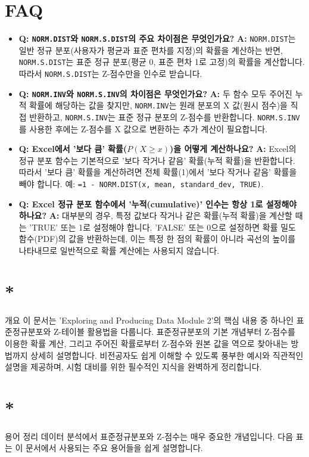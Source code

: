 \documentclass[11pt,a4paper]{article}
\theoremstyle{definition}
\newcommand{\newsection}[1]{\newpage\section{#1}}
\begin{document}
\newsection{FAQ}

\begin{itemize}
    \item \textbf{Q: \texttt{NORM.DIST}와 \texttt{NORM.S.DIST}의 주요 차이점은 무엇인가요?}
    \textbf{A:} \texttt{NORM.DIST}는 일반 정규 분포(사용자가 평균과 표준 편차를 지정)의 확률을 계산하는 반면, \texttt{NORM.S.DIST}는 표준 정규 분포(평균 0, 표준 편차 1로 고정)의 확률을 계산합니다. 따라서 \texttt{NORM.S.DIST}는 Z-점수만을 인수로 받습니다.

    \item \textbf{Q: \texttt{NORM.INV}와 \texttt{NORM.S.INV}의 차이점은 무엇인가요?}
    \textbf{A:} 두 함수 모두 주어진 누적 확률에 해당하는 값을 찾지만, \texttt{NORM.INV}는 원래 분포의 X 값(원시 점수)을 직접 반환하고, \texttt{NORM.S.INV}는 표준 정규 분포의 Z-점수를 반환합니다. \texttt{NORM.S.INV}를 사용한 후에는 Z-점수를 X 값으로 변환하는 추가 계산이 필요합니다.

    \item \textbf{Q: Excel에서 '보다 큼' 확률($P(X \ge x)$)을 어떻게 계산하나요?}
    \textbf{A:} Excel의 정규 분포 함수는 기본적으로 '보다 작거나 같음' 확률(누적 확률)을 반환합니다. 따라서 '보다 큼' 확률을 계산하려면 전체 확률(1)에서 '보다 작거나 같음' 확률을 빼야 합니다. 예: \texttt{=1 - NORM.DIST(x, mean, standard\_dev, TRUE)}.

    \item \textbf{Q: Excel 정규 분포 함수에서 '누적(cumulative)' 인수는 항상 1로 설정해야 하나요?}
    \textbf{A:} 대부분의 경우, 특정 값보다 작거나 같은 확률(누적 확률)을 계산할 때는 'TRUE' 또는 1로 설정해야 합니다. 'FALSE' 또는 0으로 설정하면 확률 밀도 함수(PDF)의 값을 반환하는데, 이는 특정 한 점의 확률이 아니라 곡선의 높이를 나타내므로 일반적으로 확률 계산에는 사용되지 않습니다.
\end{itemize}

\newsection*{개요}
이 문서는 'Exploring and Producing Data Module 2'의 핵심 내용 중 하나인 표준정규분포와 Z-테이블 활용법을 다룹니다. 표준정규분포의 기본 개념부터 Z-점수를 이용한 확률 계산, 그리고 주어진 확률로부터 Z-점수와 원본 값을 역으로 찾아내는 방법까지 상세히 설명합니다. 비전공자도 쉽게 이해할 수 있도록 풍부한 예시와 직관적인 설명을 제공하며, 시험 대비를 위한 필수적인 지식을 완벽하게 정리합니다.

\newsection*{용어 정리}
데이터 분석에서 표준정규분포와 Z-점수는 매우 중요한 개념입니다. 다음 표는 이 문서에서 사용되는 주요 용어들을 쉽게 설명합니다.
\end{document}
